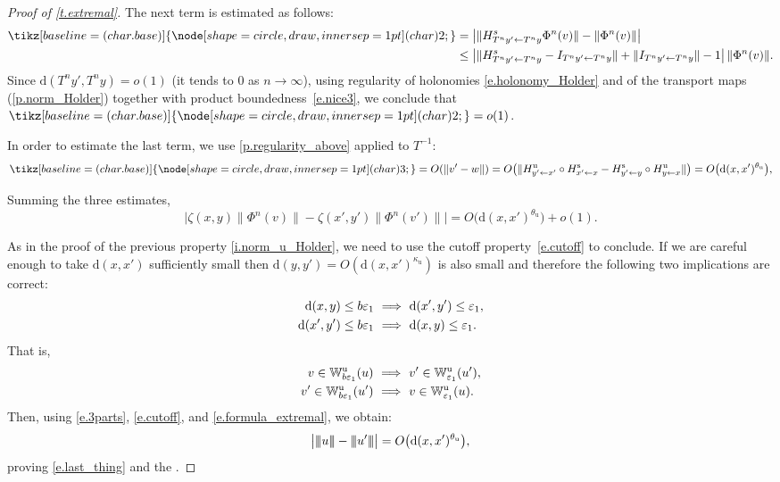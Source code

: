 \documentclass[10pt]{amsart}
\newcommand\implique{\mathchoice{\Longrightarrow}{\Rightarrow}{\Rightarrow}{\Rightarrow}}
\theoremstyle{plain}
\theoremstyle{definition}
\newcommand{\tribar}[1]{\mathopen{| {\kern -1.5pt} | {\kern -1.5pt} |} {#1}
\mathclose{| {\kern -1.5pt} | {\kern -1.5pt} |}}
\newcommand{\WW}{\mathbb{W}}
\newcommand*\circled[1]{\tikz[baseline=(char.base)]{
\node[shape=circle,draw,inner sep=1pt] (char) {\footnotesize{#1}};}}
\newcommand{\dd}{\mathrm{d}}
\newcommand{\uu}{\mathrm{u}}
\renewcommand{\ss}{\mathrm{s}}
\let\epsilon\varepsilon
\begin{document}
\begin{proof}[Proof of \cref{t.extremal}]
The next term is estimated as follows:
\begin{align*}
\circled{2}
&= \left| \| H^s_{T^n y' \gets T^n y} \Phi^n (v) \| - \| \Phi^n (v) \| \right | \\
&\le \left| \| H^s_{T^n y' \gets T^n y} - I_{T^n y' \gets T^n y}\| + \|I_{T^n y' \gets T^n y} \| - 1 \right| \|\Phi^n(v)\|.
\end{align*}
Since $\dd(T^n y', T^n y) = o(1)$ (\ie it tends to $0$ as $n \to \infty$), using regularity of holonomies \eqref{e.holonomy_Holder} and of the transport maps (\cref{p.norm_Holder}) together with product boundedness~\eqref{e.nice3}, we conclude that $\circled{2} = o(1)$.

In order to estimate the last term, we use \cref{p.regularity_above} applied to $ T^{-1} $:
\[
\circled{3} = O(\| v' - w \|)
= O\big( \| H^\uu_{y'\gets x'} \circ H^\ss_{x' \gets x} - H^\ss_{y' \gets y} \circ H^\uu_{y \gets x} \| \big)
= O\big( \dd(x,x')^{\theta_\uu} \big),
\]

Summing the three estimates,
\begin{equation}\label{e.3parts}
\big| \zeta(x,y) \|\Phi^n (v)\| - \zeta(x',y') \|\Phi^n (v')\| \big| =
O \big( \dd(x,x')^{\theta_\uu} \big) + o(1).
\end{equation}

As in the proof of the previous property \eqref{i.norm_u_Holder}, we need to use the cutoff property~\eqref{e.cutoff} to conclude.
If we are careful enough to take $\dd(x,x')$ sufficiently small then $\dd(y,y') = O(\dd(x,x')^{\kappa_\uu})$ is also small and therefore the following two implications are correct:
\begin{align*}
	\dd(x,y) \le b \epsilon_1 \ &\implique \ \dd(x',y') \le \epsilon_1, \\
	\dd(x',y') \le b \epsilon_1 \ &\implique \ \dd(x,y) \le \epsilon_1.
\end{align*}
That is,
\begin{align*}
	v \in \WW^\uu_{b \epsilon_1}(u) \ &\implique \ v' \in \WW^\uu_{\epsilon_1}(u'), \\
	v' \in \WW^\uu_{b \epsilon_1}(u') \ &\implique \ v \in \WW^\uu_{\epsilon_1}(u).
\end{align*}
Then, using \eqref{e.3parts}, \eqref{e.cutoff}, and \eqref{e.formula_extremal}, we obtain:
\[
\big| \tribar{u} - \tribar{u'} \big| = O \big( \dd(x,x')^{\theta_\uu} \big),
\]
proving \eqref{e.last_thing} and the .
\end{proof}
\end{document}
